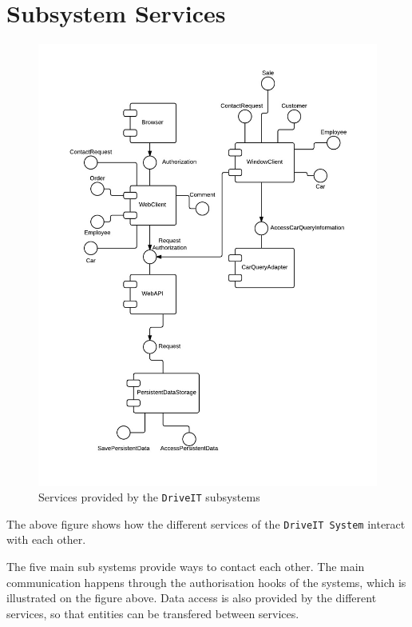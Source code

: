 \chapter{Subsystem Services}
\begin{figure}[H]
	\centering
	\includegraphics[width=\textwidth]{Figures/SubsystemServices}
	\caption{Services provided by the \texttt{DriveIT} subsystems}
	\label{fig:subsystemservices}
\end{figure}

The above figure shows how the different services of the \texttt{DriveIT System} interact with each other.

The five main sub systems provide ways to contact each other. The main communication happens through the authorisation hooks of the systems, which is illustrated on the figure above.
Data access is also provided by the different services, so that entities can be transfered between services.
